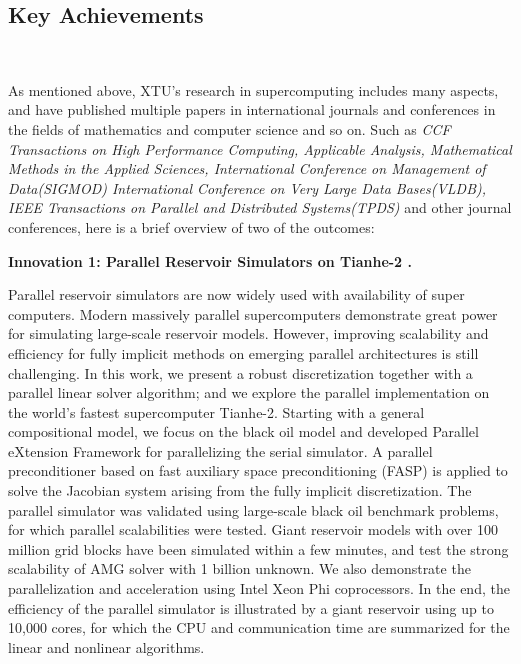 \subsection{Key Achievements}
\ 


As mentioned above, XTU's research in supercomputing includes many aspects, and  have  published multiple papers in international journals and conferences in the fields of mathematics and computer science and so on.
Such as \textit{CCF Transactions on High Performance Computing, Applicable Analysis, Mathematical Methods in the Applied Sciences, International Conference on Management of Data(SIGMOD) International Conference on Very Large Data Bases(VLDB), IEEE Transactions on Parallel and Distributed Systems(TPDS)} and other journal conferences, here is a brief overview of two of the outcomes:

\textbf{Innovation 1: Parallel Reservoir Simulators on Tianhe-2 \cite{guan2015robust}.}

Parallel reservoir simulators are now widely used with availability of super computers. 
Modern massively parallel supercomputers demonstrate great power for simulating large-scale reservoir models. However, improving scalability and efficiency for fully implicit methods on emerging parallel architectures is still challenging. 
In this work, we present a robust discretization together with a parallel linear solver algorithm; and we explore the parallel implementation on the world’s fastest supercomputer Tianhe-2.
Starting with a general compositional model, we focus on the black oil model and developed Parallel eXtension Framework for parallelizing the serial simulator. 
A parallel preconditioner based on fast auxiliary space preconditioning (FASP) is applied to solve the Jacobian system arising from the fully implicit discretization. The parallel simulator was validated using large-scale black oil benchmark problems, for which parallel scalabilities were tested. 
Giant reservoir models with over 100 million grid blocks have been simulated within a few minutes, and test the strong scalability of AMG solver with 1 billion unknown. We also demonstrate the parallelization and acceleration using Intel Xeon Phi coprocessors. 
In the end, the efficiency of the parallel simulator is illustrated by a giant reservoir using up to 10,000 cores, for which the CPU and communication time are summarized for the linear and nonlinear algorithms.

